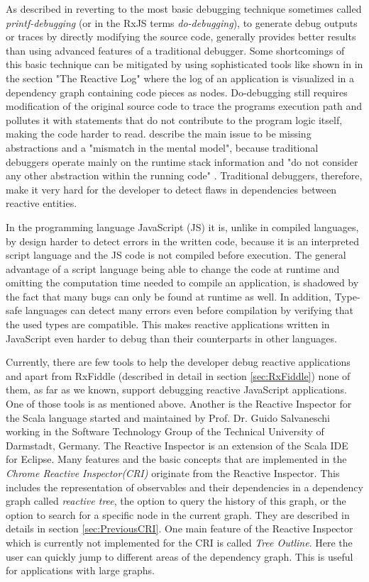 As described in \cite{MSDN_DebugginObservables} reverting to the most basic debugging technique sometimes called \emph{printf-debugging} (or in the RxJS terms \emph{do-debugging}), to generate debug outputs or traces by directly modifying the source code, generally provides better results than using advanced features of a traditional debugger. Some shortcomings of this basic technique can be mitigated by using sophisticated tools like shown in \cite{ShinyGraphFromLog} in the section "The Reactive Log" where the log of an application is visualized in a dependency graph containing code pieces as nodes. Do-debugging still requires modification of the original source code to trace the programs execution path and pollutes it with statements that do not contribute to the program logic itself, making the code harder to read. \cite{PaperReactiveProgramming} describe the main issue to be missing abstractions and a "mismatch in the mental model", because traditional debuggers operate mainly on the runtime stack information and "do not consider any other abstraction within the running code" \cite{ThesisAbbas}. Traditional debuggers, therefore, make it very hard for the developer to detect flaws in dependencies between reactive entities.

In the programming language JavaScript (JS) it is, unlike in compiled languages, by design harder to detect errors in the written code, because it is an interpreted script language and the JS code is not compiled before execution. The general advantage of a script language being able to change the code at runtime and omitting the computation time needed to compile an application, is shadowed by the fact that many bugs can only be found at runtime as well. In addition, Type-safe languages can detect many errors even before compilation by verifying that the used types are compatible. This makes reactive applications written in JavaScript even harder to debug than their counterparts in other languages.

Currently, there are few tools to help the developer debug reactive applications and apart from RxFiddle (described in detail in section \ref{sec:RxFiddle}) none of them, as far as we known, support debugging reactive JavaScript applications. One of those tools is \cite{ShinyGraphFromLog} as mentioned above. Another is the Reactive Inspector for the Scala language \cite{ReactiveInspector} started and maintained by Prof. Dr. Guido Salvaneschi working in the Software Technology Group of the Technical University of Darmstadt, Germany.
The Reactive Inspector is an extension of the Scala IDE for Eclipse. Many features and the basic concepts that are implemented in the \emph{Chrome Reactive Inspector(CRI)} originate from the Reactive Inspector. This includes the representation of observables and their dependencies in a dependency graph called \emph{reactive tree}, the option to query the history of this graph, or the option to search for a specific node in the current graph. They are described in details in section \ref{sec:PreviousCRI}. One main feature of the Reactive Inspector which is currently not implemented for the CRI is called \emph{Tree Outline}. Here the user can quickly jump to different areas of the dependency graph. This is useful for applications with large graphs.

